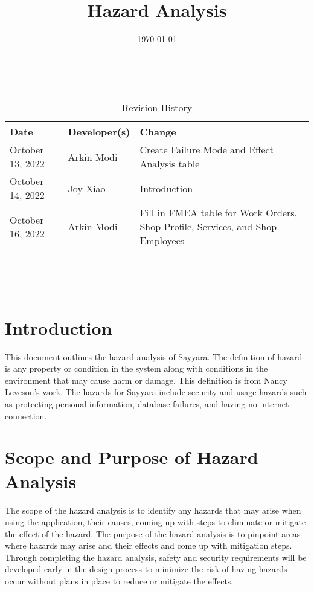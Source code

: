 \documentclass{article}
\title{Hazard Analysis\\\progname}
\author{\authname}
\date{\today}
\begin{document}
\maketitle
\thispagestyle{empty}

~\newpage


\begin{table}[hp]
	\caption{Revision History} \label{TblRevisionHistory}
	\begin{tabularx}{\textwidth}{llX}
		\toprule
		\textbf{Date}    & \textbf{Developer(s)} & \textbf{Change}                                                                \\
		\midrule
		October 13, 2022 & Arkin Modi            & Create Failure Mode and Effect Analysis table                                  \\
		October 14, 2022 & Joy Xiao              & Introduction                                                                   \\
		October 16, 2022 & Arkin Modi            & Fill in FMEA table for Work Orders, Shop Profile, Services, and Shop Employees \\
		\bottomrule
	\end{tabularx}
\end{table}

~\newpage

\tableofcontents

~\newpage


\section{Introduction}
This document outlines the hazard analysis of Sayyara. The definition of hazard is any property or
condition in the system along with conditions in the environment that may cause harm or damage.
This definition is from Nancy Leveson's work. The hazards for Sayyara include security and usage
hazards such as protecting personal information, database failures, and having no internet
connection.

\section{Scope and Purpose of Hazard Analysis}
The scope of the hazard analysis is to identify any hazards that may arise when using the
application, their causes, coming up with steps to eliminate or mitigate the effect of the hazard.
The purpose of the hazard analysis is to pinpoint areas where hazards may arise and their effects
and come up with mitigation steps. Through completing the hazard analysis, safety and security
requirements will be developed early in the design process to minimize the risk of having hazards
occur without plans in place to reduce or mitigate the effects.
\end{document}
